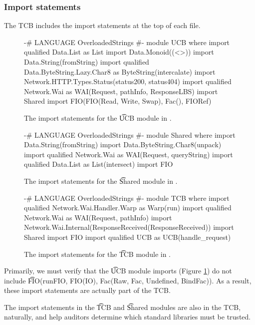 \begin{refsection}
\subsubsection{Import statements}

The TCB includes the import statements at the top of each file.
\begin{figure}
\begin{fb}
{-# LANGUAGE OverloadedStrings #-}
module UCB where
import qualified Data.List as List
import Data.Monoid((<>))
import Data.String(fromString)
import qualified Data.ByteString.Lazy.Char8 as ByteString(intercalate)
import Network.HTTP.Types.Status(status200, status404)
import qualified Network.Wai as WAI(Request, pathInfo, ResponseLBS)
import Shared
import FIO(FIO(Read, Write, Swap), Fac(), FIORef)
\end{fb}
\caption{The import statements for the \t{UCB} module in \viF{}.}
\label{code_imports_UCB}
\end{figure}
%
\begin{figure}
\begin{fb}
{-# LANGUAGE OverloadedStrings #-}
module Shared where
import Data.String(fromString)
import Data.ByteString.Char8(unpack)
import qualified Network.Wai as WAI(Request, queryString)
import qualified Data.List as List(intersect)
import FIO
\end{fb}
\caption{The import statements for the \t{Shared} module in \viF{}.}
\label{code_imports_Shared}
\end{figure}
%
\begin{figure}
\begin{fb}
{-# LANGUAGE OverloadedStrings #-}
module TCB where
import qualified Network.Wai.Handler.Warp as Warp(run)
import qualified Network.Wai as WAI(Request, pathInfo)
import Network.Wai.Internal(ResponseReceived(ResponseReceived))
import Shared
import FIO
import qualified UCB as UCB(handle_request)
\end{fb}
\caption{The import statements for the \t{TCB} module in \viF{}.}
\label{code_imports_TCB}
\end{figure}
Primarily, we must verify that the \t{UCB} module imports (Figure \ref{code_imports_UCB}) do not include
\t{FIO(runFIO, FIO(IO), Fac(Raw, Fac, Undefined, BindFac))}.
%
As a result, these import statements are actually part of the TCB.

The import statements in the \t{TCB} and \t{Shared} modules are also in the TCB, naturally,
and help auditors determine which standard libraries must be trusted.


\end{refsection}
